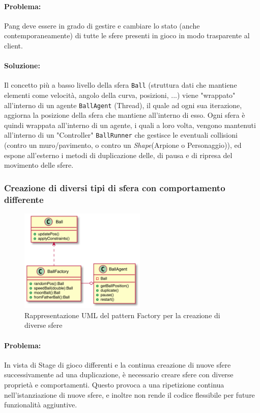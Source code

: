 \documentclass[a4paper,12pt]{report}
\begin{document}
\paragraph{Problema:} Pang deve essere in grado di gestire e cambiare lo stato (anche contemporaneamente) di tutte le sfere presenti in gioco in modo trasparente al client.
\paragraph{Soluzione:} Il concetto più a basso livello della sfera \texttt{Ball} (struttura dati che mantiene elementi come velocità, angolo della curva, posizioni, ...) viene "wrappato" all'interno di un agente \texttt{BallAgent} (Thread), il quale ad ogni sua iterazione, aggiorna la posizione della sfera che mantiene all'interno di esso. Ogni sfera è quindi wrappata all'interno di un agente, i quali a loro volta, vengono mantenuti all'interno di un "Controller" \texttt{BallRunner} che gestisce le eventuali collisioni (contro un muro/pavimento, o contro un \emph{Shape}(Arpione o Personaggio)), ed espone all'esterno i metodi di duplicazione delle, di pausa e di ripresa del movimento delle sfere.

\subsubsection{Creazione di diversi tipi di sfera con comportamento differente}

\begin{figure}[H]
\centering{}
\includegraphics[width=6cm]{img/BallFactory.png}
\caption{Rappresentazione UML del pattern Factory per la creazione di diverse sfere}
\end{figure}

\paragraph{Problema:} In vista di Stage di gioco differenti e la continua creazione di nuove sfere successivamente ad una duplicazione, è necessario creare sfere con diverse proprietà e comportamenti. Questo provoca a una ripetizione continua nell'istanziazione di nuove sfere, e inoltre non rende il codice flessibile per future funzionalità aggiuntive.
\end{document}
